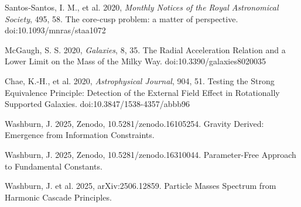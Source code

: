 \documentclass[fleqn,usenatbib]{mnras}
\begin{document}
\begin{thebibliography}{99}
 Santos-Santos, I. M., et al. 2020, \textit{Monthly Notices of the Royal Astronomical Society}, 495, 58. The core-cusp problem: a matter of perspective. doi:10.1093/mnras/staa1072

 McGaugh, S. S. 2020, \textit{Galaxies}, 8, 35. The Radial Acceleration Relation and a Lower Limit on the Mass of the Milky Way. doi:10.3390/galaxies8020035

 Chae, K.-H., et al. 2020, \textit{Astrophysical Journal}, 904, 51. Testing the Strong Equivalence Principle: Detection of the External Field Effect in Rotationally Supported Galaxies. doi:10.3847/1538-4357/abbb96


 Washburn, J. 2025, Zenodo, 10.5281/zenodo.16105254. Gravity Derived: Emergence from Information Constraints.

 Washburn, J. 2025, Zenodo, 10.5281/zenodo.16310044. Parameter-Free Approach to Fundamental Constants.

 Washburn, J. et al. 2025, arXiv:2506.12859. Particle Masses Spectrum from Harmonic Cascade Principles.

\end{thebibliography}
\end{document}
